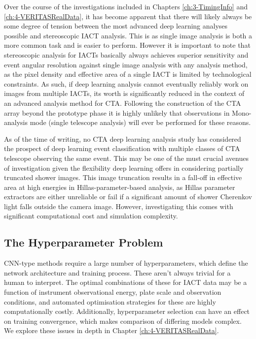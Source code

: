 Over the course of the investigations included in Chapters \ref{ch:3-TimingInfo} and \ref{ch:4-VERITASRealData}, it has become apparent that there will likely always be some degree of tension between the most advanced deep learning analyses possible and stereoscopic IACT analysis. This is as single image analysis is both a more common task and is easier to perform.  However it is important to note that stereoscopic analysis for IACTs basically always achieves superior sensitivity and event angular resolution against single image analysis with any analysis method, as the pixel density and effective area of a single IACT is limited by technological constraints. As such, if deep learning analysis cannot eventually reliably work on images from multiple IACTs, its worth is significantly reduced in the context of an advanced analysis method for CTA. Following the construction of the CTA array beyond the prototype phase it is highly unlikely that observations in Mono-analysis mode (single telescope analysis) will ever be performed for these reasons.

As of the time of writing, no CTA deep learning analysis study has considered the prospect of deep learning event classification with multiple classes of CTA telescope observing the same event. This may be one of the must crucial avenues of investigation given the flexibility deep learning offers in considering partially truncated shower images. This image truncation results in a fall-off in effective area at high energies in Hillas-parameter-based analysis, as Hillas parameter extractors are either unreliable or fail if a significant amount of shower Cherenkov light falls outside the camera image. However, investigating this comes with significant computational cost and simulation complexity.

\subsection{The Hyperparameter Problem}
CNN-type methods require a large number of hyperparameters, which define the network architecture and training process. These aren't always trivial for a human to interpret. The optimal combinations of these for IACT data may be a function of instrument observational energy, plate scale and observation conditions, and automated optimisation strategies for these are highly computationally costly. Additionally, hyperparameter selection can have an effect on training convergence, which makes comparison of differing models complex. We explore these issues in depth in Chapter \ref{ch:4-VERITASRealData}.

